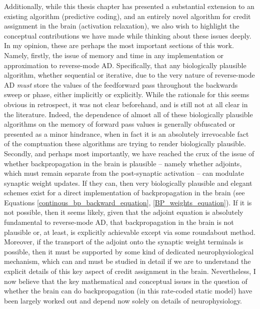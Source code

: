 Additionally, while this thesis chapter has presented a substantial extension to an existing algorithm (predictive coding), and an entirely novel algorithm for credit assignment in the brain (activation relaxation), we also wish to highlight the conceptual contributions we have made while thinking about these issues deeply. In my opinion, these are perhaps the most important sections of this work. Namely, firstly, the issue of memory and time in any implementation or approximation to reverse-mode AD. Specifically, that any biologically plausible algorithm, whether sequential or iterative, due to the very nature of reverse-mode AD \emph{must} store the values of the feedforward pass throughout the backwards sweep or phase, either implicitly or explicitly. While the rationale for this seems obvious in retrospect, it was not clear beforehand, and is still not at all clear in the literature. Indeed, the dependence of almost all of these biologically plausible algorithms on the memory of forward pass values is generally obfuscated or presented as a minor hindrance, when in fact it is an absolutely irrevocable fact of the comptuation these algorithms are trying to render biologically plausible. Secondly, and perhaps most importantly, we have reached the crux of the issue of whether backpropagation in the brain is plausible -- namely whether adjoints, which must remain separate from the post-synaptic activation -- can modulate synaptic weight updates. If they can, then very biologically plausible and elegant schemes exist for a direct implementation of backpropagation in the brain (see Equations \ref{continous_bp_backward_equation}, \ref{BP_weights_equation}). If it is not possible, then it seems likely, given that the adjoint equation is absolutely fundamental to reverse-mode AD, that backpropagation in the brain is not plausible or, at least, is explicitly achievable except via some roundabout method. Moreover, if the transport of the adjoint onto the synaptic weight terminals is possible, then it must be supported by some kind of dedicated neurophysiological mechanism, which can and must be studied in detail if we are to understand the explicit details of this key aspect of credit assignment in the brain. Nevertheless, I now believe that the key mathematical and conceptual issues in the question of whether the brain can do backpropagation (in this rate-coded static model) have been largely worked out and depend now solely on details of neurophysiology.


